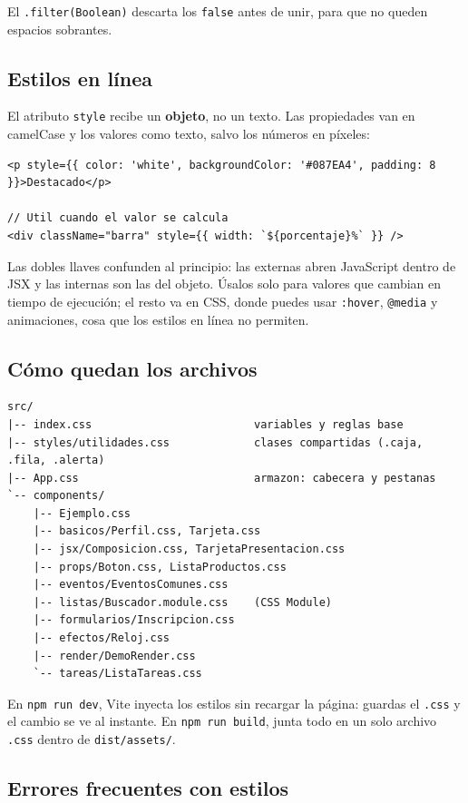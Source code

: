 \documentclass[11pt,a4paper]{article}
\newcommand{\cmd}[1]{\texttt{\color{reactdark}#1}}
\begin{document}
El \cmd{.filter(Boolean)} descarta los \cmd{false} antes de unir, para que no queden espacios sobrantes.

\subsection{Estilos en línea}

El atributo \cmd{style} recibe un \textbf{objeto}, no un texto. Las propiedades van en camelCase y los valores como texto, salvo los números en píxeles:
\begin{lstlisting}[language=JSX]
<p style={{ color: 'white', backgroundColor: '#087EA4', padding: 8 }}>Destacado</p>

// Util cuando el valor se calcula
<div className="barra" style={{ width: `${porcentaje}%` }} />
\end{lstlisting}

Las dobles llaves confunden al principio: las externas abren JavaScript dentro de JSX y las internas son las del objeto. Úsalos solo para valores que cambian en tiempo de ejecución; el resto va en CSS, donde puedes usar \cmd{:hover}, \cmd{@media} y animaciones, cosa que los estilos en línea no permiten.

\subsection{Cómo quedan los archivos}

\begin{lstlisting}[language={},numbers=none]
src/
|-- index.css                         variables y reglas base
|-- styles/utilidades.css             clases compartidas (.caja, .fila, .alerta)
|-- App.css                           armazon: cabecera y pestanas
`-- components/
    |-- Ejemplo.css
    |-- basicos/Perfil.css, Tarjeta.css
    |-- jsx/Composicion.css, TarjetaPresentacion.css
    |-- props/Boton.css, ListaProductos.css
    |-- eventos/EventosComunes.css
    |-- listas/Buscador.module.css    (CSS Module)
    |-- formularios/Inscripcion.css
    |-- efectos/Reloj.css
    |-- render/DemoRender.css
    `-- tareas/ListaTareas.css
\end{lstlisting}

En \cmd{npm run dev}, Vite inyecta los estilos sin recargar la página: guardas el \cmd{.css} y el cambio se ve al instante. En \cmd{npm run build}, junta todo en un solo archivo \cmd{.css} dentro de \cmd{dist/assets/}.

\subsection{Errores frecuentes con estilos}
\end{document}

